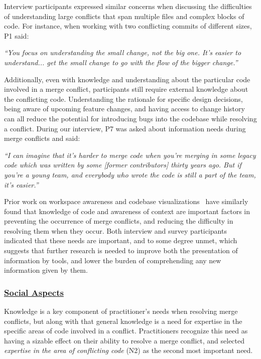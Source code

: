 Interview participants expressed similar concerns when discussing the difficulties of understanding large conflicts that span multiple files and complex blocks of code.
For instance, when working with two conflicting commits of different sizes, P1 said:
\begin{displayquote}
\textit{``You focus on understanding the small change, not the big one. It's easier to understand... get the small change to go with the flow of the bigger change.''}
\end{displayquote}

Additionally, even with knowledge and understanding about the particular code involved in a merge conflict, participants still require external knowledge about the conflicting code.
Understanding the rationale for specific design decisions, being aware of upcoming feature changes, and having access to change history can all reduce the potential for introducing bugs into the codebase while resolving a conflict.
During our interview, P7 was asked about information needs during merge conflicts and said:
\begin{displayquote}
\textit{``I can imagine that it's harder to merge code when you're merging in some legacy code which was written by some [former contributors] thirty years ago. But if you're a young team, and everybody who wrote the code is still a part of the team, it's easier.''}
\end{displayquote}

Prior work on workspace awareness and codebase visualizations~\cite{palantir}\cite{lanza_manhattan} have similarly found that knowledge of code and awareness of context are important factors in preventing the occurrence of merge conflicts, and reducing the difficulty in resolving them when they occur.
Both interview and survey participants indicated that these needs are important, and to some degree unmet, which suggests that further research is needed to improve both the presentation of information by tools, and lower the burden of comprehending any new information given by them.

\subsubsection{\underline{Social Aspects}}
Knowledge is a key component of practitioner's needs when resolving merge conflicts, but along with that general knowledge is a need for expertise in the specific areas of code involved in a conflict.
Practitioners recognize this need as having a sizable effect on their ability to resolve a merge conflict, and selected \textit{expertise in the area of conflicting code} (N2) as the second most important need.


